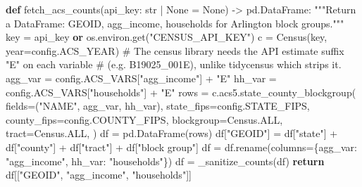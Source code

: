\documentclass[
  letterpaper,
  DIV=11,
  numbers=noendperiod]{scrreprt}
\newenvironment{Shaded}{\begin{snugshade}}{\end{snugshade}}
\newcommand{\BuiltInTok}[1]{\textcolor[rgb]{0.00,0.23,0.31}{#1}}
\newcommand{\CommentTok}[1]{\textcolor[rgb]{0.37,0.37,0.37}{#1}}
\newcommand{\ControlFlowTok}[1]{\textcolor[rgb]{0.00,0.23,0.31}{\textbf{#1}}}
\newcommand{\KeywordTok}[1]{\textcolor[rgb]{0.00,0.23,0.31}{\textbf{#1}}}
\newcommand{\NormalTok}[1]{\textcolor[rgb]{0.00,0.23,0.31}{#1}}
\newcommand{\OperatorTok}[1]{\textcolor[rgb]{0.37,0.37,0.37}{#1}}
\newcommand{\StringTok}[1]{\textcolor[rgb]{0.13,0.47,0.30}{#1}}
\newcommand{\VariableTok}[1]{\textcolor[rgb]{0.07,0.07,0.07}{#1}}
\begin{document}
\begin{Shaded}
\begin{Highlighting}[]
\KeywordTok{def}\NormalTok{ fetch\_acs\_counts(api\_key: }\BuiltInTok{str} \OperatorTok{|} \VariableTok{None} \OperatorTok{=} \VariableTok{None}\NormalTok{) }\OperatorTok{{-}\textgreater{}}\NormalTok{ pd.DataFrame:}
    \CommentTok{"""Return a DataFrame: GEOID, agg\_income, households for Arlington block groups."""}
\NormalTok{    key }\OperatorTok{=}\NormalTok{ api\_key }\KeywordTok{or}\NormalTok{ os.environ.get(}\StringTok{"CENSUS\_API\_KEY"}\NormalTok{)}
\NormalTok{    c }\OperatorTok{=}\NormalTok{ Census(key, year}\OperatorTok{=}\NormalTok{config.ACS\_YEAR)}
    \CommentTok{\# The census library needs the API estimate suffix "E" on each variable}
    \CommentTok{\# (e.g. B19025\_001E), unlike tidycensus which strips it.}
\NormalTok{    agg\_var }\OperatorTok{=}\NormalTok{ config.ACS\_VARS[}\StringTok{"agg\_income"}\NormalTok{] }\OperatorTok{+} \StringTok{"E"}
\NormalTok{    hh\_var }\OperatorTok{=}\NormalTok{ config.ACS\_VARS[}\StringTok{"households"}\NormalTok{] }\OperatorTok{+} \StringTok{"E"}
\NormalTok{    rows }\OperatorTok{=}\NormalTok{ c.acs5.state\_county\_blockgroup(}
\NormalTok{        fields}\OperatorTok{=}\NormalTok{(}\StringTok{"NAME"}\NormalTok{, agg\_var, hh\_var),}
\NormalTok{        state\_fips}\OperatorTok{=}\NormalTok{config.STATE\_FIPS,}
\NormalTok{        county\_fips}\OperatorTok{=}\NormalTok{config.COUNTY\_FIPS,}
\NormalTok{        blockgroup}\OperatorTok{=}\NormalTok{Census.ALL,}
\NormalTok{        tract}\OperatorTok{=}\NormalTok{Census.ALL,}
\NormalTok{    )}
\NormalTok{    df }\OperatorTok{=}\NormalTok{ pd.DataFrame(rows)}
\NormalTok{    df[}\StringTok{"GEOID"}\NormalTok{] }\OperatorTok{=}\NormalTok{ df[}\StringTok{"state"}\NormalTok{] }\OperatorTok{+}\NormalTok{ df[}\StringTok{"county"}\NormalTok{] }\OperatorTok{+}\NormalTok{ df[}\StringTok{"tract"}\NormalTok{] }\OperatorTok{+}\NormalTok{ df[}\StringTok{"block group"}\NormalTok{]}
\NormalTok{    df }\OperatorTok{=}\NormalTok{ df.rename(columns}\OperatorTok{=}\NormalTok{\{agg\_var: }\StringTok{"agg\_income"}\NormalTok{, hh\_var: }\StringTok{"households"}\NormalTok{\})}
\NormalTok{    df }\OperatorTok{=}\NormalTok{ \_sanitize\_counts(df)}
    \ControlFlowTok{return}\NormalTok{ df[[}\StringTok{"GEOID"}\NormalTok{, }\StringTok{"agg\_income"}\NormalTok{, }\StringTok{"households"}\NormalTok{]]}



\end{Highlighting}
\end{Shaded}
\end{document}
